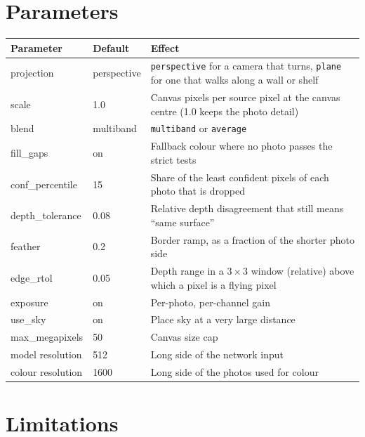 \documentclass[11pt, a4paper]{article}
\begin{document}
\section{Parameters}

\begin{center}
\small
\begin{tabularx}{\textwidth}{@{}l l X@{}}
\toprule
\textbf{Parameter} & \textbf{Default} & \textbf{Effect} \\
\midrule
projection & perspective & \texttt{perspective} for a camera that turns, \texttt{plane} for one that walks along a wall or shelf \\
scale & 1.0 & Canvas pixels per source pixel at the canvas centre (1.0 keeps the photo detail) \\
blend & multiband & \texttt{multiband} or \texttt{average} \\
fill\_gaps & on & Fallback colour where no photo passes the strict tests \\
conf\_percentile & 15 & Share of the least confident pixels of each photo that is dropped \\
depth\_tolerance & 0.08 & Relative depth disagreement that still means ``same surface'' \\
feather & 0.2 & Border ramp, as a fraction of the shorter photo side \\
edge\_rtol & 0.05 & Depth range in a $3\times3$ window (relative) above which a pixel is a flying pixel \\
exposure & on & Per-photo, per-channel gain \\
use\_sky & on & Place sky at a very large distance \\
max\_megapixels & 50 & Canvas size cap \\
model resolution & 512 & Long side of the network input \\
colour resolution & 1600 & Long side of the photos used for colour \\
\bottomrule
\end{tabularx}
\end{center}

\section{Limitations}
\end{document}
